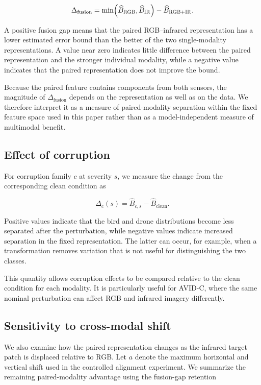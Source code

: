 \documentclass[10pt]{article}
\newcommand{\corrupt}{\textsc{AVID-C}}
\newcommand{\rgb}{\textsc{RGB}}
\newcommand{\ir}{\textsc{IR}}
\newcommand{\Bhat}{\widehat B}
\newcommand{\bfg}{\Delta_{\mathrm{fusion}}}
\begin{document}
\begin{equation}
\bfg
=
\min\!\left(
\Bhat_{\rgb},
\Bhat_{\ir}
\right)
-
\Bhat_{\rgb+\ir}.
\label{eq:bfg}
\end{equation}

A positive fusion gap means that the paired RGB--infrared representation has a lower estimated error bound than the better of the two single-modality representations. A value near zero indicates little difference between the paired representation and the stronger individual modality, while a negative value indicates that the paired representation does not improve the bound.

Because the paired feature contains components from both sensors, the magnitude of $\bfg$ depends on the representation as well as on the data. We therefore interpret it as a measure of paired-modality separation within the fixed feature space used in this paper rather than as a model-independent measure of multimodal benefit.

\subsection{Effect of corruption}

For corruption family $c$ at severity $s$, we measure the change from the corresponding clean condition as

\begin{equation}
\Delta_c(s)
=
\Bhat_{c,s}
-
\Bhat_{\mathrm{clean}}.
\label{eq:corruptpenalty}
\end{equation}

Positive values indicate that the bird and drone distributions become less separated after the perturbation, while negative values indicate increased separation in the fixed representation. The latter can occur, for example, when a transformation removes variation that is not useful for distinguishing the two classes.

This quantity allows corruption effects to be compared relative to the clean condition for each modality. It is particularly useful for \corrupt{}, where the same nominal perturbation can affect RGB and infrared imagery differently.

\subsection{Sensitivity to cross-modal shift}

We also examine how the paired representation changes as the infrared target patch is displaced relative to RGB. Let $a$ denote the maximum horizontal and vertical shift used in the controlled alignment experiment. We summarize the remaining paired-modality advantage using the fusion-gap retention
\end{document}
